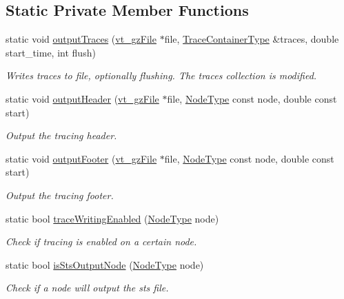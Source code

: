 \subsection*{Static Private Member Functions}
\begin{DoxyCompactItemize}
\item 
static void \hyperlink{structvt_1_1trace_1_1_trace_a97809e03528a6f31a3d990c41edfef0a}{output\+Traces} (\hyperlink{structvt_1_1trace_1_1vt__gz_file}{vt\+\_\+gz\+File} $\ast$file, \hyperlink{structvt_1_1trace_1_1_trace_a9d07ee9d9e92f63674da9954cfe9830b}{Trace\+Container\+Type} \&traces, double start\+\_\+time, int flush)
\begin{DoxyCompactList}\small\item\em Writes traces to file, optionally flushing. The traces collection is modified. \end{DoxyCompactList}\item 
static void \hyperlink{structvt_1_1trace_1_1_trace_a29e34e42f1e80a7a7171397322d3012d}{output\+Header} (\hyperlink{structvt_1_1trace_1_1vt__gz_file}{vt\+\_\+gz\+File} $\ast$file, \hyperlink{namespacevt_a866da9d0efc19c0a1ce79e9e492f47e2}{Node\+Type} const node, double const start)
\begin{DoxyCompactList}\small\item\em Output the tracing header. \end{DoxyCompactList}\item 
static void \hyperlink{structvt_1_1trace_1_1_trace_aefd9cc22457e4a086c0705f7a850375c}{output\+Footer} (\hyperlink{structvt_1_1trace_1_1vt__gz_file}{vt\+\_\+gz\+File} $\ast$file, \hyperlink{namespacevt_a866da9d0efc19c0a1ce79e9e492f47e2}{Node\+Type} const node, double const start)
\begin{DoxyCompactList}\small\item\em Output the tracing footer. \end{DoxyCompactList}\item 
static bool \hyperlink{structvt_1_1trace_1_1_trace_ad2511af5eeb837db4360a6e30b12aebb}{trace\+Writing\+Enabled} (\hyperlink{namespacevt_a866da9d0efc19c0a1ce79e9e492f47e2}{Node\+Type} node)
\begin{DoxyCompactList}\small\item\em Check if tracing is enabled on a certain node. \end{DoxyCompactList}\item 
static bool \hyperlink{structvt_1_1trace_1_1_trace_a6d72cba8cfa150f7c97e99b9d65a1cf7}{is\+Sts\+Output\+Node} (\hyperlink{namespacevt_a866da9d0efc19c0a1ce79e9e492f47e2}{Node\+Type} node)
\begin{DoxyCompactList}\small\item\em Check if a node will output the sts file. \end{DoxyCompactList}\end{DoxyCompactItemize}
